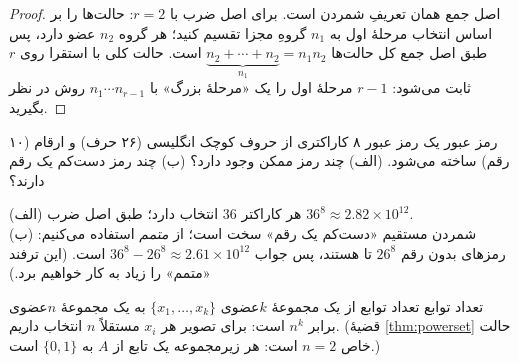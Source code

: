 \begin{proof}
اصل جمع همان تعریفِ شمردن است. برای اصل ضرب با $r=2$: حالت‌ها را بر اساس انتخاب مرحلهٔ اول به $n_1$ گروهِ مجزا تقسیم کنید؛ هر گروه $n_2$ عضو دارد، پس طبق اصل جمع کل حالت‌ها $\underbrace{n_2+\cdots+n_2}_{n_1}=n_1n_2$ است. حالت کلی با استقرا روی $r$ ثابت می‌شود: $r-1$ مرحلهٔ اول را یک «مرحلهٔ بزرگ» با $n_1\cdots n_{r-1}$ روش در نظر بگیرید.
\end{proof}

\begin{figblock}

\end{figblock}

\begin{example}{رمز عبور}
یک رمز عبور ۸ کاراکتری از حروف کوچک انگلیسی (۲۶ حرف) و ارقام (۱۰ رقم) ساخته می‌شود. (الف) چند رمز ممکن وجود دارد؟ (ب) چند رمز دست‌کم یک رقم دارند؟
\begin{solution}
(الف) هر کاراکتر $36$ انتخاب دارد؛ طبق اصل ضرب $36^8\approx 2.82\times10^{12}$.\\
(ب) شمردن مستقیم «دست‌کم یک رقم» سخت است؛ از \emph{متمم} استفاده می‌کنیم: رمزهای بدون رقم $26^8$ تا هستند، پس جواب $36^8-26^8\approx 2.61\times10^{12}$ است. (این ترفند «متمم» را زیاد به کار خواهیم برد.)
\end{solution}
\end{example}

\begin{example}{تعداد توابع}
تعداد توابع از یک مجموعهٔ $k$عضوی $\{x_1,\dots,x_k\}$ به یک مجموعهٔ $n$عضوی برابر $n^k$ است: برای تصویر هر $x_i$ مستقلاً $n$ انتخاب داریم. (قضیهٔ \ref{thm:powerset} حالت خاص $n=2$ است: هر زیرمجموعه یک تابع از $A$ به $\{0,1\}$ است.)
\end{example}

